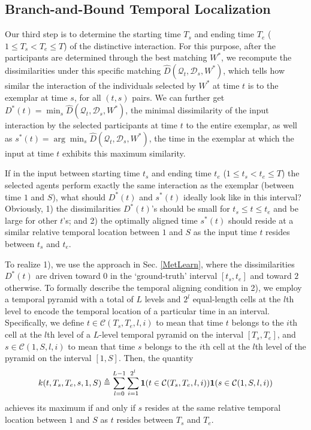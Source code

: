 \subsection{Branch-and-Bound Temporal Localization}
\label{BB}
\vspace{-5pt}
Our third step is to determine the starting time $T_s$ and ending time $T_e$ ($1\le T_s<T_e\le T$) of the distinctive interaction. For this purpose, after the participants are determined through the best matching $W^{*}$, we recompute the dissimilarities under this specific matching $\hat{D}(\mathcal{Q}_{t}, \mathcal{D}_{s}, W^{*})$, which tells how similar the interaction of the individuals selected by $W^{*}$ at time $t$ is to the exemplar at time $s$, for all $(t,s)$ pairs. We can further get  $D^{*}(t)=\min_{s}\hat{D}(\mathcal{Q}_{t}, \mathcal{D}_{s}, W^{*})$, the minimal dissimilarity of the input interaction by the selected participants at time $t$ to the entire exemplar, as well as $s^{*}(t)=\arg\min_{s}\hat{D}(\mathcal{Q}_{t}, \mathcal{D}_{s}, W^{*})$, the time in the exemplar at which the input at time $t$ exhibits this maximum similarity.  

If in the input between starting time $t_{s}$ and ending time $t_{e}$ ($1\leq t_{s}<t_{e}\leq T$) the selected agents perform exactly the same interaction as the exemplar (between time $1$ and $S$), what should $D^{*}(t)$ and $s^{*}(t)$ ideally look like in this interval? Obviously, 1) the dissimilarities $D^{*}(t)$'s should be small for $t_{s}\le t\le t_{e}$ and be large for other $t$'s; and 2) the optimally aligned time $s^{*}(t)$ should reside at a similar relative temporal location between $1$ and $S$ as the input time $t$ resides between $t_{s}$ and $t_{e}$.

To realize 1), we use the approach in Sec. \ref{MetLearn}, where the dissimilarities $D^{*}(t)$ are driven toward 0 in the `ground-truth' interval $[t_{s}, t_{e}]$ and toward $2$ otherwise. To formally describe the temporal aligning condition in 2), we employ a temporal pyramid with a total of $L$ levels and $2^{l}$ equal-length cells at the $l$th level to encode the temporal location of a particular time in an interval. Specifically, we define $t\in\mathcal{C}(T_{s},T_{e}, l,i)$ to mean that time $t$ belongs to the $i$th cell at the $l$th level of a $L$-level temporal pyramid on the interval $[T_{s},T_{e}]$, and $s\in\mathcal{C}(1,S, l,i)$ to mean that time $s$ belongs to the $i$th cell at the $l$th level of the pyramid on the interval $[1,S]$. Then, the quantity
\begin{equation}
\vspace{-5pt}
k(t, T_{s},T_{e}, s, 1,S)\triangleq\sum^{L-1}_{l=0}\sum^{2^{l}}_{i=1} \mathbf{1}(t\in\mathcal{C}(T_{s},T_{e}, l,i))\mathbf{1}(s\in\mathcal{C}(1,S, l,i))
\end{equation}
achieves its maximum if and only if $s$ resides at the same relative temporal location between $1$ and $S$ as $t$ resides between $T_{s}$ and $T_{e}$.

